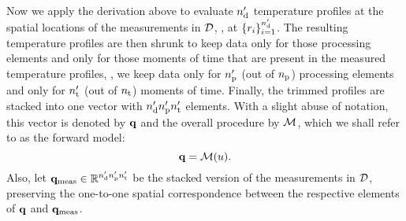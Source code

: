 



Now we apply the derivation above to evaluate ${n_\text{d}'}$ temperature profiles at the spatial locations of the measurements in $\mathcal{D}$, \ie, at $\{ r_i \}_{i = 1}^{n_\text{d}'}$. The resulting temperature profiles are then shrunk to keep data only for those processing elements and only for those moments of time that are present in the measured temperature profiles, \ie, we keep data only for ${n_\text{p}'}$ (out of ${n_\text{p}}$) processing elements and only for ${n_\text{t}'}$ (out of ${n_\text{t}}$) moments of time. Finally, the trimmed profiles are stacked into one vector with ${n_\text{d}'} {n_\text{p}'} {n_\text{t}'}$ elements. With a slight abuse of notation, this vector is denoted by $\mathbf{q}$ and the overall procedure by $\model$, which we shall refer to as the forward model:
\begin{equation} \elabel{model}
  \mvT = \model{\u}.
\end{equation}
Also, let $\mathbf{q}_{\text{meas}} \in \mathbb{R}^{{n_\text{d}'} {n_\text{p}'} {n_\text{t}'}}$ be the stacked version of the measurements in $\mathcal{D}$, preserving the one-to-one spatial correspondence between the respective elements of $\mathbf{q}$ and $\mathbf{q}_{\text{meas}}$.
